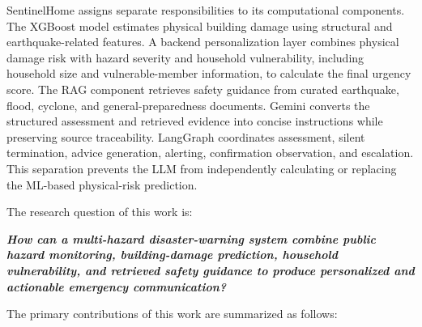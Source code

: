 SentinelHome assigns separate responsibilities to its computational components. The XGBoost model estimates physical building damage using structural and earthquake-related features. A backend personalization layer combines physical damage risk with hazard severity and household vulnerability, including household size and vulnerable-member information, to calculate the final urgency score. The RAG component retrieves safety guidance from curated earthquake, flood, cyclone, and general-preparedness documents. Gemini converts the structured assessment and retrieved evidence into concise instructions while preserving source traceability. LangGraph coordinates assessment, silent termination, advice generation, alerting, confirmation observation, and escalation. This separation prevents the LLM from independently calculating or replacing the ML-based physical-risk prediction.

The research question of this work is:

\textit{\textbf{How can a multi-hazard disaster-warning system combine public hazard monitoring, building-damage prediction, household vulnerability, and retrieved safety guidance to produce personalized and actionable emergency communication?}}

The primary contributions of this work are summarized as follows:

